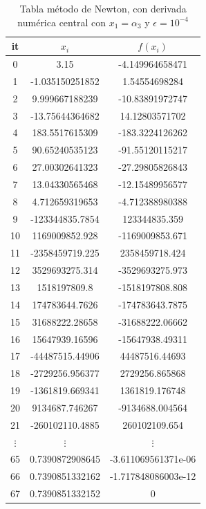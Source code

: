 \documentclass{article} %
\begin{document}
\begin{table}[H]
\centering
\begin{tabular}{|c|c|c|}
\hline
it & $x_i$ & $f(x_i)$\\
\hline
0 & 3.15 & -4.149964658471\\
1 & -1.035150251852 & 1.54554698284\\
2 & 9.999667188239 & -10.83891972747\\
3 & -13.75644364682 & 14.12803571702\\
4 & 183.5517615309 & -183.3224126262\\
5 & 90.65240535123 & -91.55120115217\\
6 & 27.00302641323 & -27.29805826843\\
7 & 13.04330565468 & -12.15489956577\\
8 & 4.712659319653 & -4.712388980388\\
9 & -123344835.7854 & 123344835.359\\
10 & 1169009852.928 & -1169009853.671\\
11 & -2358459719.225 & 2358459718.424\\
12 & 3529693275.314 & -3529693275.973\\
13 & 1518197809.8 & -1518197808.808\\
14 & 174783644.7626 & -174783643.7875\\
15 & 31688222.28658 & -31688222.06662\\
16 & 15647939.16596 & -15647938.49311\\
17 & -44487515.44906 & 44487516.44693\\
18 & -2729256.956377 & 2729256.865868\\
19 & -1361819.669341 & 1361819.176748\\
20 & 9134687.746267 & -9134688.004564\\
21 & -260102110.4885 & 260102109.654\\
$\vdots$ & $\vdots$ & $\vdots$\\
65 & 0.7390872908645 & -3.611069561371e-06\\
66 & 0.7390851332162 & -1.717848086003e-12\\
67 & 0.7390851332152 & 0\\
\hline
\end{tabular}
\caption{Tabla método de Newton, con derivada numérica central con $x_1 = \alpha_3$ y $\epsilon = 10^{-4}$}
\end{table}
\end{document}
